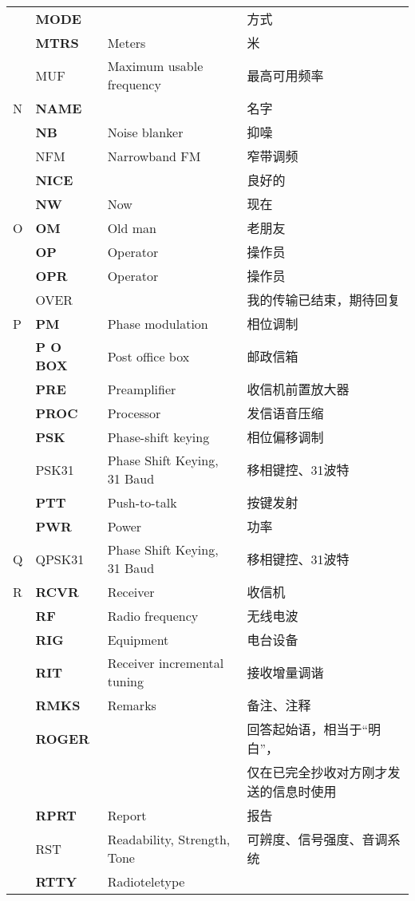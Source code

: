 \begin{longtable}[l]{llll}
& \textbf{MODE} & & 方式 \\
& \textbf{MTRS} & Meters & 米 \\
& MUF & Maximum usable frequency & 最高可用频率 \\
N & \textbf{NAME} & & 名字 \\
& \textbf{NB} & Noise blanker & 抑噪 \\
& NFM & Narrowband FM & 窄带调频 \\
& \textbf{NICE} & & 良好的 \\
& \textbf{NW} & Now & 现在 \\
O & \textbf{OM} & Old man & 老朋友 \\%
& \textbf{OP} & Operator & 操作员 \\
& \textbf{OPR} & Operator & 操作员 \\
& OVER & & 我的传输已结束，期待回复 \\
P & \textbf{PM} & Phase modulation & 相位调制 \\
& \textbf{P O BOX} & Post office box & 邮政信箱 \\
& \textbf{PRE} & Preamplifier & 收信机前置放大器 \\
& \textbf{PROC} & Processor & 发信语音压缩 \\
& \textbf{PSK} & Phase-shift keying & 相位偏移调制 \\
& PSK31 & Phase Shift Keying, 31 Baud & 移相键控、31波特 \\
& \textbf{PTT} & Push-to-talk & 按键发射 \\
& \textbf{PWR} & Power & 功率 \\
Q & QPSK31 & Phase Shift Keying, 31 Baud & 移相键控、31波特 \\
R & \textbf{RCVR} & Receiver & 收信机 \\
& \textbf{RF} & Radio frequency & 无线电波 \\
& \textbf{RIG} & Equipment & 电台设备 \\
& \textbf{RIT} & Receiver incremental tuning & 接收增量调谐 \\
& \textbf{RMKS} & Remarks & 备注、注释 \\
& \textbf{ROGER} & & 回答起始语，相当于“明白”， \\
& &  & 仅在已完全抄收对方刚才发送的信息时使用 \\
& \textbf{RPRT} & Report & 报告 \\
& RST & Readability, Strength, Tone & 可辨度、信号强度、音调系统 \\
& \textbf{RTTY} & Radioteletype & \\

\end{longtable}
